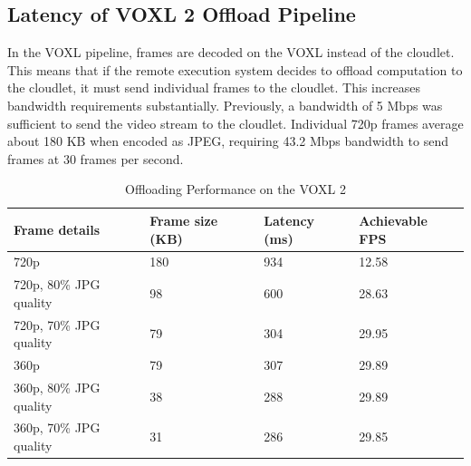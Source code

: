 \subsection{Latency of VOXL 2 Offload Pipeline}

In the VOXL pipeline, frames are decoded on the VOXL instead of the cloudlet.
This means that if the remote execution system decides to offload computation
to the cloudlet, it must send individual frames to the cloudlet. This increases
bandwidth requirements substantially. Previously, a bandwidth of 5 Mbps was
sufficient to send the video stream to the cloudlet. Individual 720p frames
average about 180 KB when encoded as JPEG, requiring 43.2 Mbps bandwidth to
send frames at 30 frames per second.

\begin{table}
    \begin{tabular}{llll}
        \toprule
        \textbf{Frame details} & \textbf{Frame size (KB)} & \textbf{Latency (ms)} & \textbf{Achievable FPS}\\
        \midrule
        720p & 180 & 934 & 12.58\\
        720p, 80\% JPG quality  & 98 & 600 &28.63\\
        720p, 70\% JPG quality & 79 & 304 & 29.95\\
        360p & 79 & 307  &29.89 \\
        360p, 80\% JPG quality & 38 &288 & 29.89\\
        360p, 70\% JPG quality & 31 & 286 & 29.85\\
        \bottomrule
\end{tabular}
\caption{Offloading Performance on the VOXL 2}
\label{tab:voxl2-offload-performance}
\end{table}
